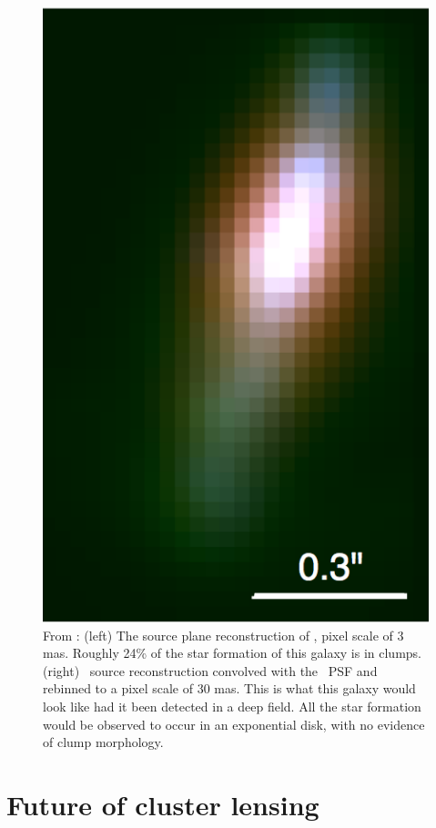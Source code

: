 \begin{figure}
\includegraphics[height=0.4\textheight]{Conclusion/candelized_lowres.png}
\caption[Comparison of lensed \giantarc\ source reconstruction to its unlensed deep field realization]{From \citet{Rigby:2017qy}: (left) The source plane reconstruction of \giantarc, pixel scale of 3 mas. Roughly 24\% of the star formation of this galaxy is in clumps. (right) \giantarc\ source reconstruction convolved with the \hst\ PSF and rebinned to a pixel scale of 30 mas. This is what this galaxy would look like had it been detected in a deep field. All the star formation would be observed to occur in an exponential disk, with no evidence of clump morphology.}
\label{conc:fig:candelized}
\end{figure}

\section{Future of cluster lensing}

